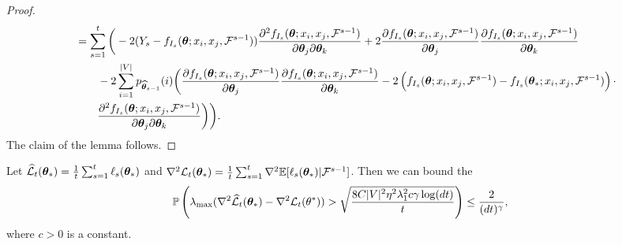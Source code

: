 \begin{proof}
\begin{align*}
    &= \sum_{s=1}^t \bigg(-2(Y_s - f_{I_s}(\bm{\theta}; x_i, x_j, \mathcal{F}^{s-1}))\dfrac{\partial^2 f_{I_s}(\bm{\theta}; x_i, x_j, \mathcal{F}^{s-1})}{\partial \bm{\theta}_j\partial\bm{\theta}_k} + 2\dfrac{\partial f_{I_s}(\bm{\theta}; x_i, x_j, \mathcal{F}^{s-1})}{\partial \bm{\theta}_j}\dfrac{\partial f_{I_s}(\bm{\theta}; x_i, x_j, \mathcal{F}^{s-1})}{\partial \bm{\theta}_k}\\
    &\qquad  - 2 \sum_{i=1}^{|V|} p_{{\widehat{\bm{\theta}}}_{s-1}}(i)\bigg(\dfrac{\partial f_{I_s}(\bm{\theta} ; x_i, x_j, \mathcal{F}^{s-1})}{\partial \bm{\theta}_j}\dfrac{\partial f_{I_s}(\bm{\theta} ; x_i, x_j, \mathcal{F}^{s-1})}{\partial \bm{\theta}_k} - 2\left(f_{I_s}(\bm{\theta} ; x_i, x_j, \mathcal{F}^{s-1}) - f_{I_s}(\bm{\theta}_*; x_i, x_j, \mathcal{F}^{s-1})\right)\cdot\\
    &\qquad\dfrac{\partial^2 f_{I_s}(\bm{\theta} ; x_i, x_j, \mathcal{F}^{s-1})}{\partial \bm{\theta}_j\partial\bm{\theta}_k}\bigg)\bigg).
\end{align*}
The claim of the lemma follows.
\end{proof}


\begin{lemma}
\label{lemma:matrix-conc3}
Let $\widehat{\cal L}_t(\bm{\theta}_*) = \frac{1}{t}\sum_{s=1}^t \ell_{s}(\bm{\theta}_*)$ and $\nabla^2 {\cal L}_t(\bm{\theta}_*) = \frac{1}{t}\sum_{s=1}^t \nabla^2\mathbb{E}[\ell_{s}(\bm{\theta}_*)|\mathcal{F}^{s-1}]$. Then we can bound the 
\begin{align*}
    \mathbb{P}&\left(\lambda_{\max}(\nabla^2\widehat{\cal L}_t(\bm{\theta}_*) - \nabla^2 {\cal L}_t(\theta^*)) > \sqrt{\dfrac{8C|V|^2\eta^2\lambda^2_1c \gamma \log(dt)}{t}}\right) \leq \dfrac{2}{(dt)^{\gamma}},
\end{align*}
where $c > 0$ is a constant.
\end{lemma}


